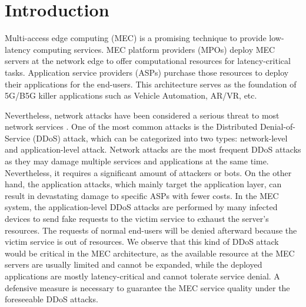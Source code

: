 \documentclass[10pt,journal, compsoc]{IEEEtran}
\begin{document}
%
\IEEEpeerreviewmaketitle
\section{Introduction}
Multi-access edge computing (MEC) is a promising technique to provide low-latency computing services. MEC platform providers (MPOs) deploy MEC servers at the network edge to offer computational resources for latency-critical tasks. Application service providers (ASPs) purchase those resources to deploy their applications for the end-users. This architecture serves as the foundation of 5G/B5G killer applications such as Vehicle Automation, AR/VR, etc.

Nevertheless, network attacks have been considered a serious threat to most network services \cite{Singh}. One of the most common attacks is the Distributed Denial-of-Service (DDoS) attack, which can be categorized into two types: network-level and application-level attack\cite{Zargar}. Network attacks are the most frequent DDoS attacks as they may damage multiple services and applications at the same time. Nevertheless, it requires a significant amount of attackers or bots. On the other hand, the application attacks, which mainly target the application layer, can result in devastating damage to specific ASPs \cite{Praseed} with fewer costs. In the MEC system, the application-level DDoS attacks are performed by many infected devices to send fake requests to the victim service to exhaust the server's resources\cite{Ranjan}. The requests of normal end-users will be denied afterward because the victim service is out of resources. We observe that this kind of DDoS attack would be critical in the MEC architecture, as the available resource at the MEC servers are usually limited and cannot be expanded, while the deployed applications are mostly latency-critical and cannot tolerate service denial. A defensive measure is necessary to guarantee the MEC service quality under the foreseeable DDoS attacks\cite{Tripathi}\cite{Agrawal}.
\end{document}
